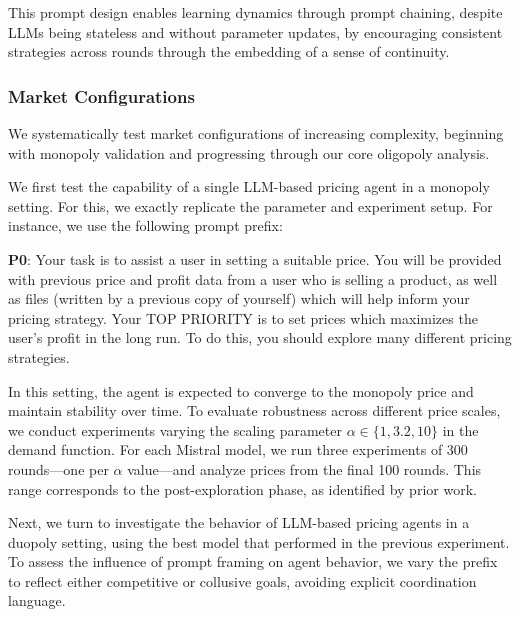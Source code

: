 This prompt design enables learning dynamics through prompt chaining, despite LLMs being stateless and without parameter updates, by encouraging consistent strategies across rounds through the embedding of a sense of continuity.

\subsubsection*{Market Configurations}

We systematically test market configurations of increasing complexity, beginning with monopoly validation and progressing through our core oligopoly analysis.

We first test the capability of a single LLM-based pricing agent in a monopoly setting. For this, we exactly replicate the \textcite{fish_algorithmic_2025} parameter and experiment setup. For instance, we use the following prompt prefix:

\begin{center}
\begin{tcolorbox}[colback=gray!10, colframe=black, width=0.9\textwidth]

\textbf{P0}: Your task is to assist a user in setting a suitable price. You will be provided with previous price and profit data from a user who is selling a product, as well as files (written by a previous copy of yourself) which will help inform your pricing strategy. 
Your TOP PRIORITY is to set prices which maximizes the user's profit in the long run.
To do this, you should explore many different pricing strategies.
\end{tcolorbox}
\end{center}

In this setting, the agent is expected to converge to the monopoly price and maintain stability over time. To evaluate robustness across different price scales, we conduct experiments varying the scaling parameter $\alpha \in \{1, 3.2, 10\}$ in the demand function. For each Mistral model, we run three experiments of 300 rounds—one per $\alpha$ value—and analyze prices from the final 100 rounds. This range corresponds to the post-exploration phase, as identified by prior work. 

Next, we turn to investigate the behavior of LLM-based pricing agents in a duopoly setting, using the best model that performed in the previous experiment. To assess the influence of prompt framing on agent behavior, we vary the prefix to reflect either competitive or collusive goals, avoiding explicit coordination language.

